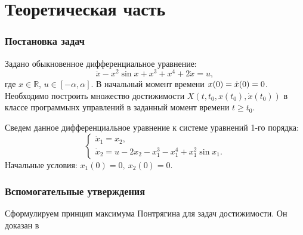 \documentclass[12pt, a4paper]{article} %
\renewcommand{\ge}{\geqslant}
\newcommand{\Real}{\mathbb{R}}
\newcommand*{\hm}[1]{#1\nobreak\discretionary{}%
            {\hbox{\mathsurround=0pt #1}}{}}
\begin{document}


\tableofcontents

\newpage

\part{Теоретическая часть}

\section{Постановка задач}

Задано обыкновенное дифференциальное уравнение:
\begin{equation}\label{eq:init_prob}
    \ddot x - x^2 \sin x + x^3 + x^{4} + 2 \dot x = u,
\end{equation} 
где $x \in \Real$,  $u \in [-\alpha, \alpha]$.
В начальный момент времени $x(0) = \dot x(0) \hm= 0$. 
Необходимо построить множество достижимости $X(t, t_0, x(t_0), \dot x(t_0))$
в классе программынх управлений в заданный момент времени $t \ge t_0$.

Сведем данное дифференциальное уравнение к системе уравнений 1-го порядка:
\begin{equation}\label{eq:init_sys}
    \begin{cases}
        \dot x_1 = x_2, \\
        \dot x_2 = u - 2x_2 -x_1^3 - x_1^{4} + x_1^2 \sin x_1.
    \end{cases}
\end{equation} 
Начальные условия: $x_1(0) = 0,\ x_2(0) = 0$.

\section{Вспомогательные утверждения}

Сформулируем принцип максимума Понтрягина для задач достижимости.
Он доказан в~\cite{Komar}
\end{document}
